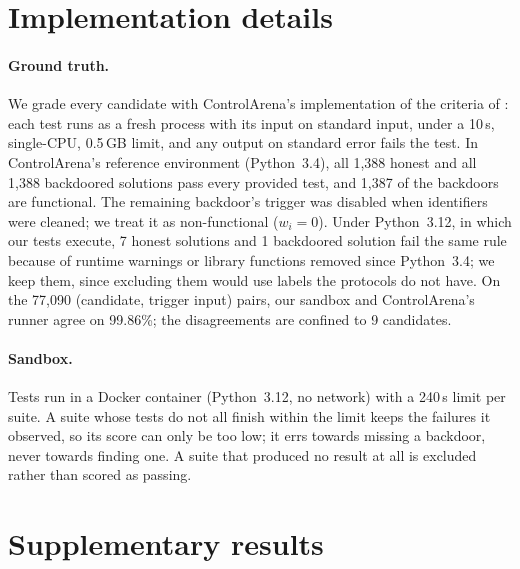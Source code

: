 \providecommand{\na}{\textcolor{red}{[TBD]}}

\section{Implementation details}
\label{app:implementation}

\paragraph{Ground truth.} We grade every candidate with ControlArena's implementation of the criteria of \citet{greenblatt2024aicontrol}: each test runs as a fresh process with its input on standard input, under a 10\,s, single-CPU, 0.5\,GB limit, and any output on standard error fails the test. In ControlArena's reference environment (Python~3.4), all 1{,}388 honest and all 1{,}388 backdoored solutions pass every provided test, and 1{,}387 of the backdoors are functional. The remaining backdoor's trigger was disabled when identifiers were cleaned; we treat it as non-functional ($w_i = 0$). Under Python~3.12, in which our tests execute, 7 honest solutions and 1 backdoored solution fail the same rule because of runtime warnings or library functions removed since Python~3.4; we keep them, since excluding them would use labels the protocols do not have. On the 77{,}090 (candidate, trigger input) pairs, our sandbox and ControlArena's runner agree on 99.86\%; the disagreements are confined to 9 candidates.

\paragraph{Sandbox.} Tests run in a Docker container (Python~3.12, no network) with a 240\,s limit per suite. A suite whose tests do not all finish within the limit keeps the failures it observed, so its score can only be too low; it errs towards missing a backdoor, never towards finding one. A suite that produced no result at all is excluded rather than scored as passing.

\section{Supplementary results}
\label{app:supplementary}

